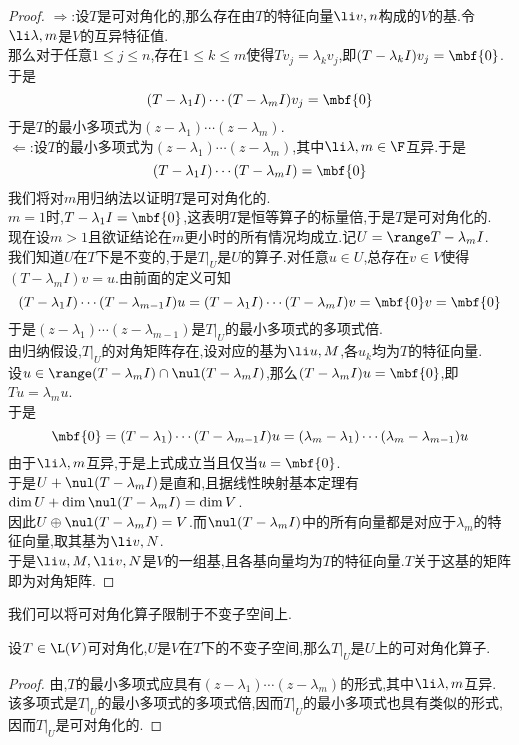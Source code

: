 \documentclass{ctexart}
\begin{document}
\begin{proof}
    $\Rightarrow$:设$T$是可对角化的,那么存在由$T$的特征向量$\li v,n$构成的$V$的基.令$\li\lambda,m$是$V$的互异特征值.\\
    那么对于任意$1\leqslant j\leqslant n$,存在$1\leqslant k\leqslant m$使得$Tv_j=\lambda_kv_j$,即$(T-\lambda_kI)v_j=\mbf{0}$.于是
    $$(T-\lambda_1I)\cdots(T-\lambda_mI)v_j=\mbf{0}$$
    于是$T$的最小多项式为$(z-\lambda_1)\cdots(z-\lambda_m)$.\\
    $\Leftarrow$:设$T$的最小多项式为$(z-\lambda_1)\cdots(z-\lambda_m)$,其中$\li\lambda,m\in\F$互异.于是
    $$(T-\lambda_1I)\cdots(T-\lambda_mI)=\mbf{0}$$
    我们将对$m$用归纳法以证明$T$是可对角化的.\\
    $m=1$时,$T-\lambda_1I=\mbf{0}$,这表明$T$是恒等算子的标量倍,于是$T$是可对角化的.\\
    现在设$m>1$且欲证结论在$m$更小时的所有情况均成立.记$U=\range T-\lambda_mI$.\\
    我们知道$U$在$T$下是不变的,于是$T|_{U}$是$U$的算子.对任意$u\in U$,总存在$v\in V$使得$(T-\lambda_mI)v=u$.由前面的定义可知
    $$(T-\lambda_1I)\cdots(T-\lambda_{m-1}I)u=(T-\lambda_1I)\cdots(T-\lambda_mI)v=\mbf{0}v=\mbf{0}$$
    于是$(z-\lambda_1)\cdots(z-\lambda_{m-1})$是$T|_U$的最小多项式的多项式倍.\\
    由归纳假设,$T|_U$的对角矩阵存在,设对应的基为$\li u,M$,各$u_k$均为$T$的特征向量.\\
    设$u\in\range(T-\lambda_mI)\cap\nul(T-\lambda_mI)$,那么$(T-\lambda_mI)u=\mbf{0}$,即$Tu=\lambda_mu$.\\
    于是$$\mbf{0}=(T-\lambda_1)\cdots(T-\lambda_{m-1}I)u=(\lambda_m-\lambda_1)\cdots(\lambda_m-\lambda_{m-1})u$$
    由于$\li\lambda,m$互异,于是上式成立当且仅当$u=\mbf{0}$.\\
    于是$U+\nul(T-\lambda_mI)$是直和,且据线性映射基本定理有$\dim U+\dim\nul(T-\lambda_mI)=\dim V$.\\
    因此$U\oplus\nul(T-\lambda_mI)=V$.而$\nul(T-\lambda_mI)$中的所有向量都是对应于$\lambda_m$的特征向量,取其基为$\li v,N$.\\
    于是$\li u,M,\li v,N$是$V$的一组基,且各基向量均为$T$的特征向量.$T$关于这基的矩阵即为对角矩阵.
\end{proof}\noindent
我们可以将可对角化算子限制于不变子空间上.
\begin{formal}[2.5 作用于不变子空间上的可对角化算子]
    设$T\in\L(V)$可对角化,$U$是$V$在$T$下的不变子空间,那么$T|_U$是$U$上的可对角化算子.
\end{formal}
\begin{proof}
    由,$T$的最小多项式应具有$(z-\lambda_1)\cdots(z-\lambda_m)$的形式,其中$\li\lambda,m$互异.%
    该多项式是$T|_U$的最小多项式的多项式倍,因而$T|_U$的最小多项式也具有类似的形式,因而$T|_U$是可对角化的.
\end{proof}\noindent
\end{document}
